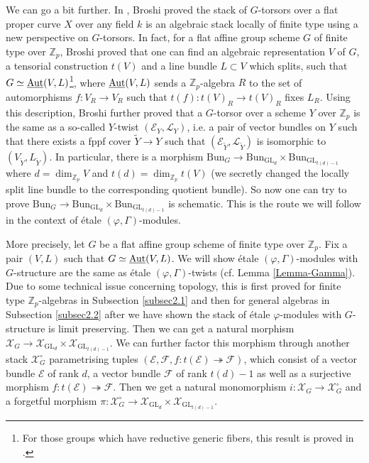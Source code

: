 \documentclass[10pt]{article}
\numberwithin{equation}{section}
\newcommand{\bZ}{{\mathbb Z}}
\newcommand{\calE}{{\mathcal E}}
\newcommand{\calF}{{\mathcal F}}
\newcommand{\calL}{{\mathcal L}}
\newcommand{\calX}{{\mathcal X}}
\newcommand{\Bun}{{\mathrm{Bun}}}           %
\newcommand{\GL}{{\mathrm{GL}}}             %
\begin{document}
We can go a bit further. In \cite{Bro13}, Broshi proved the stack of $G$-torsors over a flat proper curve $X$ over any field $k$ is an algebraic stack locally of finite type using a new perspective on $G$-torsors. In fact, for a flat affine group scheme $G$ of finite type over $\bZ_p$, Broshi proved that one can find an algebraic representation $V$ of $G$, a tensorial construction $t(V)$ and a line bundle $L\subset V$ which splits, such that $G\simeq \underline{\mathrm{Aut}}(V,L)$\footnote{For those groups which have reductive generic fibers, this result is proved in \cite[Proposition 1.3.2]{kisin2010integral}.}, where $\underline{\mathrm{Aut}}(V,L)$ sends a $\bZ_p$-algebra $R$ to the set of automorphisms $f:V_R\to V_R$ such that $t(f):t(V)_R\to t(V)_R$ fixes $L_R$. Using this description, Broshi further proved that a $G$-torsor over a scheme $Y$ over $\bZ_p$ is the same as a so-called $Y$-twist $(\calE_Y,\calL_Y)$, i.e. a pair of vector bundles on $Y$ such that there exists a fppf cover $\tilde Y\to Y$ such that $(\calE_{\tilde Y},\calL_{\tilde Y})$ is isomorphic to $(V_{\tilde Y},L_{\tilde Y})$. In particular, there is a morphism $\Bun_G\to \Bun_{\GL_d}\times \Bun_{\GL_{t(d)-1}}$ where $d=\dim_{\bZ_p}V$ and $t(d)=\dim_{\bZ_p}t(V)$ (we secretly changed the locally split line bundle to the corresponding quotient bundle). So now one can try to prove $\Bun_G\to \Bun_{\GL_d}\times \Bun_{\GL_{t(d)-1}}$ is schematic. This is the route we will follow in the context of \'etale $(\varphi,\Gamma)$-modules.

More precisely, let $G$ be a flat affine group scheme of finite type over $\bZ_p$. Fix a pair $(V,L)$ such that $G\simeq \underline{\mathrm{Aut}}(V,L)$. We will show \'etale $(\varphi,\Gamma)$-modules with $G$-structure are the same as \'etale $(\varphi,\Gamma)$-twists (cf. Lemma \ref{Lemma-Gamma}). Due to some technical issue concerning topology, this is first proved for finite type $\bZ_p$-algebras in Subsection \ref{subsec2.1} and then for general algebras in Subsection \ref{subsec2.2} after we have shown the stack of \'etale $\varphi$-modules with $G$-structure is limit preserving. Then we can get a natural morphism $\calX_G\to \calX_{\GL_d}\times \calX_{\GL_{t(d)-1}}$. We can further factor this morphism through another stack $\calX_G^{\circ}$ parametrising tuples $(\calE,\calF,f:t(\calE)\twoheadrightarrow \calF)$, which consist of a vector bundle $\calE$ of rank $d$, a vector bundle $\calF$ of rank $t(d)-1$ as well as a surjective morphism $f:t(\calE)\twoheadrightarrow \calF$. Then we get a natural monomorphism $i:\calX_G\to \calX_G^{\circ}$ and a forgetful morphism $\pi:\calX_G^{\circ}\to \calX_{\GL_d}\times \calX_{\GL_{t(d)-1}}$.
\end{document}
